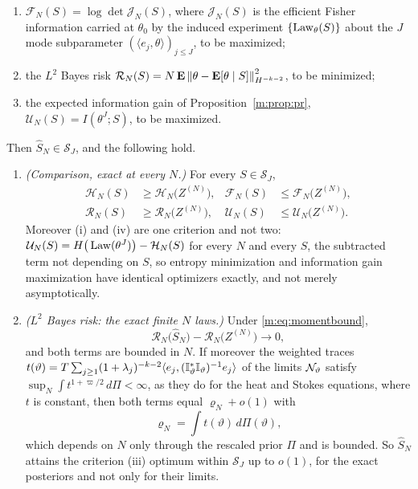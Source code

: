\begin{proposition}
\begin{enumerate}[label=(\roman*),nosep]
\item $\mathcal F_N(S)=\log\det\mathcal J_N(S)$, where $\mathcal J_N(S)$ is the efficient Fisher information carried at $\theta_0$ by the induced experiment $\{\operatorname{Law}_\theta(S)\}$ about the $J$ mode subparameter $(\langle e_j,\theta\rangle)_{j\le J}$, to be maximized;
\item the $L^2$ Bayes risk $\mathcal R_N(S)=N\,\mathbf{E}\left\|\theta-\mathbf{E}[\theta\mid S]\right\|^2_{H^{-k-2}}$, to be minimized;
\item the expected information gain of Proposition~\ref{m:prop:pr}, $\mathcal U_N(S)=I(\theta^J;S)$, to be maximized.
\end{enumerate}
Then $\hat S_N\in\mathcal S_J$, and the following hold.
\begin{enumerate}[label=(\alph*),nosep]
\item \emph{(Comparison, exact at every $N$.)} For every $S\in\mathcal S_J$,
\[
\begin{aligned}
\mathcal H_N(S)&\ge\mathcal H_N\big(Z^{(N)}\big), & \mathcal F_N(S)&\le\mathcal F_N\big(Z^{(N)}\big),\\
\mathcal R_N(S)&\ge\mathcal R_N\big(Z^{(N)}\big), & \mathcal U_N(S)&\le\mathcal U_N\big(Z^{(N)}\big) .
\end{aligned}
\]
Moreover (i) and (iv) are one criterion and not two: $\mathcal U_N(S)=H\big(\operatorname{Law}(\theta^J)\big)-\mathcal H_N(S)$ for every $N$ and every $S$, the subtracted term not depending on $S$, so entropy minimization and information gain maximization have identical optimizers exactly, and not merely asymptotically.
\item \emph{($L^2$ Bayes risk: the exact finite $N$ laws.)} Under \eqref{m:eq:momentbound},
\[
\mathcal R_N\big(\hat S_N\big)-\mathcal R_N\big(Z^{(N)}\big)\longrightarrow0 ,
\]
and both terms are bounded in $N$. If moreover the weighted traces $t(\vartheta)=T\sum_{j\ge1}(1+\lambda_j)^{-k-2}\langle e_j,(\mathbb{I}^*_\vartheta\mathbb{I}_\vartheta)^{-1}e_j\rangle$ of the limits $\mathcal{N}_\vartheta$ satisfy $\sup_N\int t^{1+\varpi/2}\,d\Pi<\infty$, as they do for the heat and Stokes equations, where $t$ is constant, then both terms equal $\varrho_N+o(1)$ with
\[
\varrho_N=\int t(\vartheta)\,d\Pi(\vartheta) ,
\]
which depends on $N$ only through the rescaled prior $\Pi$ and is bounded. So $\hat S_N$ attains the criterion (iii) optimum within $\mathcal S_J$ up to $o(1)$, for the exact posteriors and not only for their limits.

\end{enumerate}
\end{proposition}
